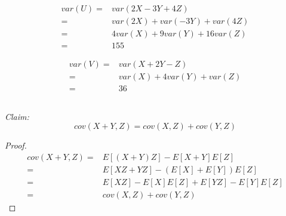 \documentclass{article}
\begin{document}
            \begin{equation*}
                \begin{split}
                    var(U)=&var(2X-3Y+4Z)\\
                        =&var(2X)+var(-3Y)+var(4Z)\\
                        =&4var(X)+9var(Y)+16var(Z)\\
                        =&155
                \end{split}
            \end{equation*}

            \begin{equation*}
                \begin{split}
                    var(V)=&var(X+2Y-Z)\\
                        =&var(X)+4var(Y)+var(Z)\\
                        =&36
                \end{split}
            \end{equation*}


        \subsection{}
        \textit{Claim:}
            $$cov(X+Y,Z)=cov(X,Z)+cov(Y,Z)$$
           
        \begin{proof}
            \begin{equation*}
                \begin{split}
                    cov(X+Y,Z)=&E[(X+Y)Z]-E[X+Y]E[Z]\\
                        =&E[XZ+YZ]-(E[X]+E[Y])E[Z]\\
                        =&E[XZ]-E[X]E[Z]+E[YZ]-E[Y]E[Z]\\
                        =&cov(X,Z)+cov(Y,Z)
                \end{split}
            \end{equation*}
        \end{proof}
\end{document}
